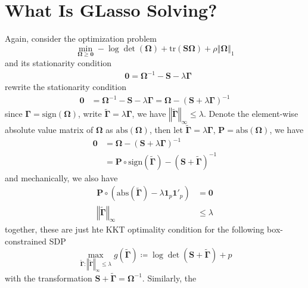 \documentclass[twoside]{article}
\begin{document}
\section{What Is GLasso Solving?}
Again, consider the optimization problem 
\begin{equation*}
    \min_{\boldsymbol{\Omega}\geq \mathbf{0}} -\log \det (\boldsymbol{\Omega}) + \mathrm{tr}(\mathbf{S}\boldsymbol{\Omega}) +\rho\left\Vert \boldsymbol{\Omega} \right\Vert _1 
\end{equation*}
and its stationarity condition
\begin{align*}
    &\mathbf{0} = \boldsymbol{\Omega}^{-1} - \mathbf{S} -\lambda \boldsymbol{\Gamma}
\end{align*}
rewrite the stationarity condition
\begin{align*}
    \mathbf{0} &= \boldsymbol{\Omega}^{-1} - \mathbf{S} -\lambda \boldsymbol{\Gamma} = \boldsymbol{\Omega} - \left(\mathbf{S}+ \lambda\boldsymbol{\Gamma}\right)^{-1}
\end{align*}
since $\boldsymbol{\Gamma}=\mathrm{sign}(\boldsymbol{\Omega})$, write $\tilde{\boldsymbol{\Gamma}}=\lambda \boldsymbol{\Gamma}$, we have $\left\Vert \tilde{\boldsymbol{\Gamma}} \right\Vert _{\infty}\leq \lambda$. Denote the element-wise absolute value matrix of $\boldsymbol{\Omega}$ as $\mathrm{abs}(\boldsymbol{\Omega})$, then let $\tilde{\boldsymbol{\Gamma}} = \lambda \boldsymbol{\Gamma}$, $\mathbf{P}=\mathrm{abs}(\boldsymbol{\Omega})$, we have 
\begin{align*}
    \mathbf{0} &= \boldsymbol{\Omega} - \left(\mathbf{S}+ \lambda\boldsymbol{\Gamma}\right)^{-1}\\
    &= \mathbf{P} \circ \mathrm{sign}(\tilde{\boldsymbol{\Gamma}}) - (\mathbf{S}+\tilde{\boldsymbol{\Gamma}})^{-1}
\end{align*}
and mechanically, we also have
\begin{align*}
    \mathbf{P} \circ \left(\mathrm{abs}(\tilde{\boldsymbol{\Gamma}}) -\lambda\mathbf{1}_p\mathbf{1}'_p \right) &= \mathbf{0} \\
    \left\Vert \tilde{\boldsymbol{\Gamma}} \right\Vert _{\infty} &\leq \lambda
\end{align*}
together, these are just hte KKT optimality condition for the following box-constrained SDP
\begin{equation}
    \max_{\tilde{\boldsymbol{\Gamma}}:\left\Vert \tilde{\boldsymbol{\Gamma}} \right\Vert _{\infty}\leq \lambda} g(\tilde{\boldsymbol{\Gamma}}) \coloneq \log\det (\mathbf{S}+\tilde{\boldsymbol{\Gamma}}) + p
\end{equation}
with the transformation $\mathbf{S}+\tilde{\boldsymbol{\Gamma}} = \boldsymbol{\Omega}^{-1}$. Similarly, the 
\end{document}
